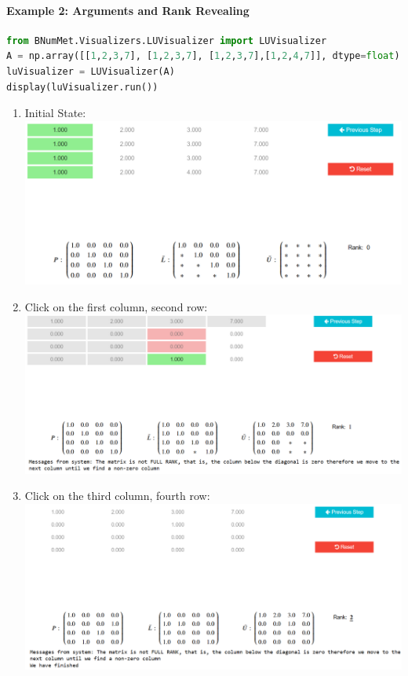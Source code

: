 \paragraph{Example 2: Arguments and Rank Revealing}{
\begin{lstlisting}[language=Python]
from BNumMet.Visualizers.LUVisualizer import LUVisualizer
A = np.array([[1,2,3,7], [1,2,3,7], [1,2,3,7],[1,2,4,7]], dtype=float)
luVisualizer = LUVisualizer(A)
display(luVisualizer.run())
\end{lstlisting}

\begin{enumerate}
\item Initial State: \\
\includegraphics[scale=0.45]{Include/Images/Thesis/Documentation/Visualizers/LUVisualizer/Example 2/Example 2 - 00 - Initial State.png}

\item Click on the first column, second row: \\
\includegraphics[scale=0.4]{Include/Images/Thesis/Documentation/Visualizers/LUVisualizer/Example 2/Example 2 - 01 - Click first column, second row.png}

\item Click on the third column, fourth row: \\
\includegraphics[scale=0.4]{Include/Images/Thesis/Documentation/Visualizers/LUVisualizer/Example 2/Example 2 - 02 - Click thirdcolumn, fourth row.png}
\end{enumerate}
}

